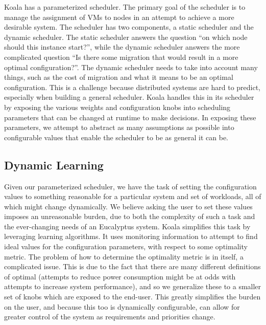
Koala has a parameterized scheduler.  The primary goal of the scheduler is to
manage the assignment of VMs to nodes in an attempt to achieve a more desirable
system.  The scheduler has two components, a static scheduler and the dynamic
scheduler.  The static scheduler answers the question ``on which node should
this instance start?'', while the dynamic scheduler answers the more
complicated question ``Is there some migration that would result in a more
optimal configuration?''.  The dynamic scheduler needs to take into account
many things, such as the cost of migration and what it means to be an optimal
configuration.  This is a challenge because distributed systems are hard to
predict, especially when building a general scheduler.  Koala handles this in
its scheduler by exposing the various weights and configuration knobs into
scheduling parameters that can be changed at runtime to make decisions.  In
exposing these parameters, we attempt to abstract as many assumptions as
possible into configurable values that enable the scheduler to be as general it
can be.

\subsection{Dynamic Learning}
Given our parameterized scheduler, we have the task of setting the
configuration values to something reasonable for a particular system and set of
workloads, all of which might change dynamically.  We believe asking the user
to set these values imposes an unreasonable burden, due to both the complexity
of such a task and the ever-changing needs of an Eucalyptus system.  Koala
simplifies this task by leveraging learning algorithms.  It uses monitoring
information to attempt to find ideal values for the configuration parameters,
with respect to some optimality metric.  The problem of how to determine the
optimality metric is in itself, a complicated issue.  This is due to the fact
that there are many different definitions of optimal (attempts to reduce power
consumption might be at odds with attempts to increase system performance), and
so we generalize these to a smaller set of knobs which are exposed to the
end-user.  This greatly simplifies the burden on the user, and because this too
is dynamically configurable, can allow for greater control of the system as
requirements and priorities change.

